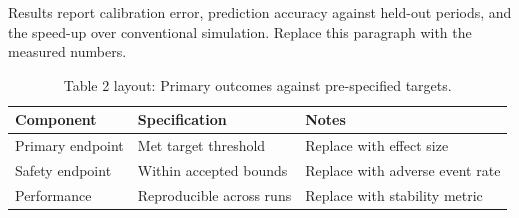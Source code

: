 
Results report calibration error, prediction accuracy against held-out periods, and the speed-up over conventional simulation. Replace this paragraph with the measured numbers.

\begin{table}[H]
\caption{Table 2 layout: Primary outcomes against pre-specified targets.}
\label{tab:results_primary}
\centering
\begin{tabular}{>{\raggedright\arraybackslash}p{3.4cm} >{\raggedright\arraybackslash}p{4.6cm} >{\raggedright\arraybackslash}p{5.4cm}}
\toprule
\textbf{Component} & \textbf{Specification} & \textbf{Notes} \\
\midrule
  Primary endpoint & Met target threshold & Replace with effect size \\
  Safety endpoint & Within accepted bounds & Replace with adverse event rate \\
  Performance & Reproducible across runs & Replace with stability metric \\
\bottomrule
\end{tabular}
\end{table}
